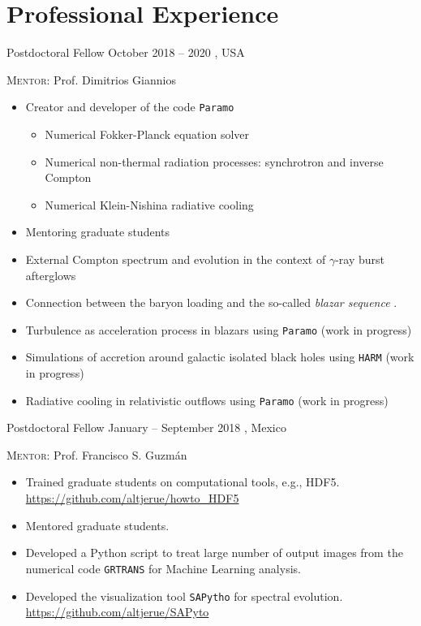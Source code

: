 \section{Professional Experience}

\cventry{}%
{\DPA}%
{Postdoctoral Fellow}%
{October 2018 -- 2020}%
{\Purdue, USA}%
{\textsc{Mentor}: Prof. Dimitrios Giannios%
  \begin{itemize}
    \item Creator and developer of the code \texttt{Paramo}
    \begin{itemize}
      \item Numerical Fokker-Planck equation solver
      \item Numerical non-thermal radiation processes: synchrotron and inverse Compton
      \item Numerical Klein-Nishina radiative cooling
    \end{itemize}
    \item Mentoring graduate students
    \item External Compton spectrum and evolution in the context of $\gamma$-ray burst afterglows \cite{Zhang:2020ch}
    \item Connection between the baryon loading and the so-called \emph{blazar sequence} \cite{RuedaBecerril:2020ha}.
    \item Turbulence as acceleration process in blazars using \texttt{Paramo} (work in progress)
    \item Simulations of accretion around galactic isolated black holes using \texttt{HARM} (work in progress)
    \item Radiative cooling in relativistic outflows using \texttt{Paramo} (work in progress)
  \end{itemize}
}
\cventry{}%
{\IFMes}%
{Postdoctoral Fellow}%
{\hspace{-30ex}January -- September 2018}%
{\UMSNHes, Mexico}%
{\textsc{Mentor}: Prof. Francisco S. Guzmán
  \begin{itemize}
    \item Trained graduate students on computational tools, e.g., HDF5. \url{https://github.com/altjerue/howto_HDF5}
    \item Mentored graduate students.
    \item Developed a Python script to treat large number of output images from the numerical code \texttt{GRTRANS} for Machine Learning analysis.
    \item Developed the visualization tool \texttt{SAPytho} for spectral evolution. \url{https://github.com/altjerue/SAPyto}
  \end{itemize}
}
